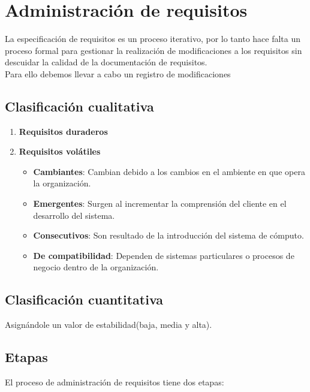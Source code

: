 \section{Administración de requisitos}
La especificación de requisitos es un proceso iterativo, por lo tanto hace falta un proceso formal para gestionar la realización de modificaciones a los requisitos sin descuidar la calidad de la documentación de requisitos.\\
Para ello debemos llevar a cabo un registro de modificaciones

\subsection{Clasificación cualitativa}
\begin{enumerate}
    \item \textbf{Requisitos duraderos}
    \item \textbf{Requisitos volátiles}
    \begin{itemize}
        \item \textbf{Cambiantes}: Cambian debido a los cambios en el ambiente en que opera la organización. 
        \item \textbf{Emergentes}: Surgen al incrementar la comprensión del cliente en el desarrollo del sistema.
        \item \textbf{Consecutivos}: Son resultado de la introducción del sistema de cómputo. %
        \item \textbf{De compatibilidad}: Dependen de sistemas particulares o procesos de negocio dentro de la organización.
    \end{itemize}
\end{enumerate}
\subsection{Clasificación cuantitativa}
Asignándole un valor de estabilidad(baja, media y alta).

\subsection{Etapas}
El proceso de administración de requisitos tiene dos etapas:

